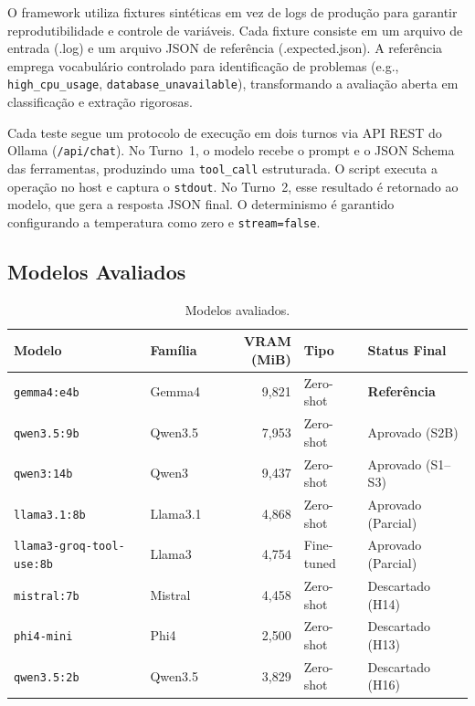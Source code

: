 \documentclass{kdmile}
\begin{document}
O framework utiliza fixtures sintéticas em vez de logs de produção para
garantir reprodutibilidade e controle de variáveis. Cada fixture consiste em
um arquivo de entrada (.log) e um arquivo JSON de referência (.expected.json).
A referência emprega vocabulário controlado para identificação de problemas
(e.g., \texttt{high\_cpu\_usage}, \texttt{database\_unavailable}),
transformando a avaliação aberta em classificação e extração rigorosas.

Cada teste segue um protocolo de execução em dois turnos via API REST do Ollama
(\texttt{/api/chat}). No Turno~1, o modelo recebe o prompt e o JSON Schema das
ferramentas, produzindo uma \texttt{tool\_call} estruturada. O script executa a
operação no host e captura o \texttt{stdout}. No Turno~2, esse resultado é
retornado ao modelo, que gera a resposta JSON final. O determinismo é garantido
configurando a temperatura como zero e \texttt{stream=false}.

\subsection{Modelos Avaliados}

\begin{table}[ht]
\centering
\caption{Modelos avaliados.}
\label{tab:models}
\begin{tabular}{llrll}
\toprule
\textbf{Modelo} & \textbf{Família} & \textbf{VRAM (MiB)} & \textbf{Tipo} & \textbf{Status Final} \\
\midrule
\texttt{gemma4:e4b}             & Gemma4    & 9{,}821 & Zero-shot  & \textbf{Referência} \\
\texttt{qwen3.5:9b}             & Qwen3.5   & 7{,}953 & Zero-shot  & Aprovado (S2B) \\
\texttt{qwen3:14b}              & Qwen3     & 9{,}437 & Zero-shot  & Aprovado (S1--S3) \\
\texttt{llama3.1:8b}            & Llama3.1  & 4{,}868 & Zero-shot  & Aprovado (Parcial) \\
\texttt{llama3-groq-tool-use:8b}& Llama3    & 4{,}754 & Fine-tuned & Aprovado (Parcial) \\
\texttt{mistral:7b}             & Mistral   & 4{,}458 & Zero-shot  & Descartado (H14) \\
\texttt{phi4-mini}              & Phi4      & 2{,}500 & Zero-shot  & Descartado (H13) \\
\texttt{qwen3.5:2b}             & Qwen3.5   & 3{,}829 & Zero-shot  & Descartado (H16) \\
\bottomrule
\end{tabular}
\end{table}
\end{document}
